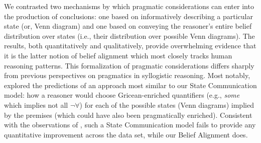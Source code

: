 \documentclass[floatsintext, doc]{apa6}
\newcommand{\mht}[1]{{\textcolor{Blue}{[mht: #1]}}}
\begin{document}
We contrasted two mechanisms by which pragmatic considerations can enter into the production of conclusions: one based on informatively describing a particular state (or, Venn diagram) and one based on conveying the reasoner's entire belief distribution over states (i.e., their distribution over possible Venn diagrams). 
The results, both quantitatively and qualitatively, provide overwhelming evidence that it is the latter notion of belief alignment which most closely tracks human reasoning patterns. 
This formalization of pragmatic considerations differs sharply from previous perspectives on pragmatics in syllogistic reasoning.
Most notably,  explored the predictions of an approach most similar to our State Communication model: how a reasoner would choose Gricean-enriched quantifiers (e.g., \emph{some} which implies not all $\neg \forall$) for each of the possible states (Venn diagrams) implied by the premises (which could have also been pragmatically enriched). 
Consistent with the observations of , such a State Communication model fails to provide any quantitative improvement across the data set, while our Belief Alignment does.




\end{document}
